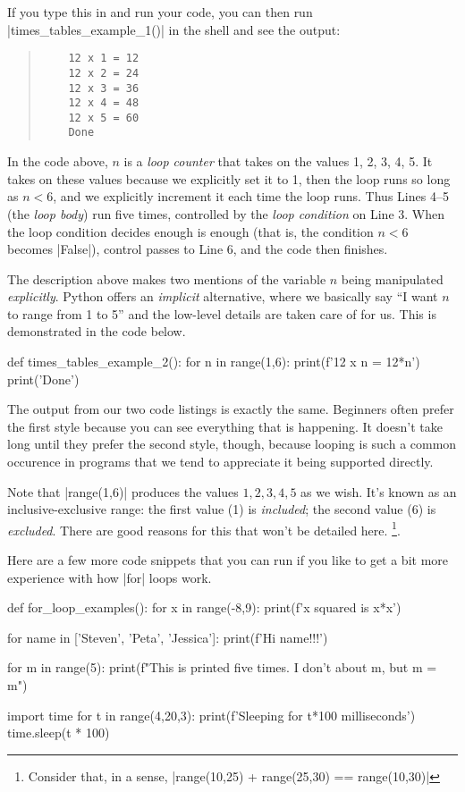 If you type this in and run your code, you can then run \pycode|times_tables_example_1()|
in the shell and see the output:

\begin{quote}
  \begin{verbatim}
    12 x 1 = 12
    12 x 2 = 24
    12 x 3 = 36
    12 x 4 = 48
    12 x 5 = 60
    Done
  \end{verbatim}
\end{quote}

In the code above, $n$ is a \emph{loop counter} that takes on the values 1, 2, 3, 4, 5. It
takes on these values because we explicitly set it to 1, then the loop runs so long as $n
< 6$, and we explicitly increment it each time the loop runs. Thus Lines 4--5 (the
\emph{loop body}) run five times, controlled by the \emph{loop condition} on Line 3. When
the loop condition decides enough is enough (that is, the condition $n < 6$ becomes
\pycode|False|), control passes to Line 6, and the code then finishes.

The description above makes two mentions of the variable $n$ being manipulated
\emph{explicitly}. Python offers an \emph{implicit} alternative, where we basically say
``I want $n$ to range from 1 to 5'' and the low-level details are taken care of for us.
This is demonstrated in the code below.

\begin{pythoncode}
  def times_tables_example_2():
    for n in range(1,6):
      print(f'12 x {n} = {12*n}')
    print('Done')
\end{pythoncode}

The output from our two code listings is exactly the same. Beginners often prefer the
first style because you can see everything that is happening. It doesn't take long until
they prefer the second style, though, because looping is such a common occurence in
programs that we tend to appreciate it being supported directly.

Note that \pycode|range(1,6)| produces the values $1,2,3,4,5$ as we wish. It's known as an
inclusive-exclusive range: the first value (1) is \emph{included}; the second value (6) is
\emph{excluded}. There are good reasons for this that won't be detailed here.%
\footnote{Consider that, in a sense, \pycode|range(10,25) + range(25,30) == range(10,30)|}.

Here are a few more code snippets that you can run if you like to get a bit more
experience with how \pycode|for| loops work.

\begin{pythoncode}
  def for_loop_examples():
    for x in range(-8,9):
      print(f'{x} squared is {x*x}')

    for name in ['Steven', 'Peta', 'Jessica']:
      print(f'Hi {name}!!!')

    for m in range(5):
      print(f"This is printed five times. I don't about m, but m = {m}")

    import time
    for t in range(4,20,3):
      print(f'Sleeping for {t*100} milliseconds')
      time.sleep(t * 100)
\end{pythoncode}


